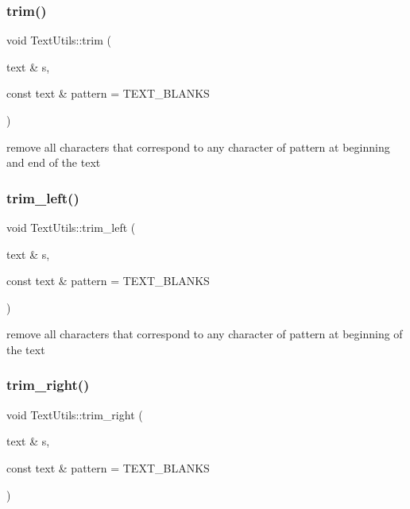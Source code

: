 \subsubsection{\texorpdfstring{trim()}{trim()}}
{\footnotesize\ttfamily void Text\+Utils\+::trim (\begin{DoxyParamCaption}\item[{text \&}]{s,  }\item[{const text \&}]{pattern = {\ttfamily TEXT\+\_\+BLANKS} }\end{DoxyParamCaption})\hspace{0.3cm}{\ttfamily [static]}}

remove all characters that correspond to any character of pattern at beginning and end of the text \mbox{\label{classez_1_1essential_1_1TextUtils_a5c5473723c73d5df9c57712a29b5b7d2}} 
\subsubsection{\texorpdfstring{trim\+\_\+left()}{trim\_left()}}
{\footnotesize\ttfamily void Text\+Utils\+::trim\+\_\+left (\begin{DoxyParamCaption}\item[{text \&}]{s,  }\item[{const text \&}]{pattern = {\ttfamily TEXT\+\_\+BLANKS} }\end{DoxyParamCaption})\hspace{0.3cm}{\ttfamily [static]}}

remove all characters that correspond to any character of pattern at beginning of the text \mbox{\label{classez_1_1essential_1_1TextUtils_ad9570b43b0b7b3bcbd3e385beb36b7fb}} 
\subsubsection{\texorpdfstring{trim\+\_\+right()}{trim\_right()}}
{\footnotesize\ttfamily void Text\+Utils\+::trim\+\_\+right (\begin{DoxyParamCaption}\item[{text \&}]{s,  }\item[{const text \&}]{pattern = {\ttfamily TEXT\+\_\+BLANKS} }\end{DoxyParamCaption})\hspace{0.3cm}{\ttfamily [static]}}

